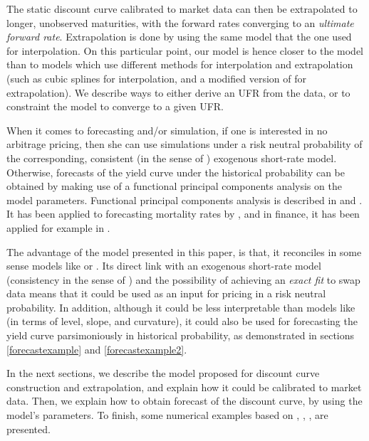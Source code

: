 The static discount curve calibrated to market data can then be extrapolated to longer, unobserved maturities, with the forward rates converging to an \textit{ultimate forward rate}. Extrapolation is done by using the same model that the one used for interpolation. On this particular point, our model is hence closer to the \cite{smithwilson2001} model than to models which use different methods for interpolation and extrapolation (such as cubic splines for interpolation, and a modified version of \cite{nelson1987parsimonious} for extrapolation). We describe ways to either derive an UFR from the data, or to constraint the model to converge to a given UFR.


\medskip

When it comes to forecasting and/or simulation, if one is interested in no arbitrage pricing, then she can use simulations under a risk neutral probability of the corresponding, consistent (in the sense of \cite{bjork1999interest}) exogenous short-rate model. Otherwise, forecasts of the yield curve under the historical probability can be obtained by making use of a functional principal components analysis on the model parameters. Functional principal components analysis is described in \cite{ramsay1991some} and \cite{ramsay2005springer}. It has been applied to forecasting mortality rates by \cite{hyndman2007robust}, and in finance, it has been applied for example in . 

\medskip

The advantage of the model presented in this paper, is that, it reconciles in some sense models like \cite{diebold2006forecasting} or \cite{smithwilson2001}. Its direct link with an exogenous short-rate model (consistency in the sense of \cite{bjork1999interest}) and the possibility of achieving an \textit{exact fit} to swap data means that it could be used as an input for pricing in a risk neutral probability. In addition, although it could be less interpretable than models like \cite{diebold2006forecasting} (in terms of level, slope, and curvature), it could also be used for forecasting the yield curve parsimoniously in historical probability, as demonstrated in sections \ref{forecastexample} and \ref{forecastexample2}.  

\medskip

In the next sections, we describe the model proposed for discount curve construction and extrapolation, and explain how it could be calibrated to market data. Then, we explain how to obtain forecast of the discount curve, by using the model's parameters. To finish, some numerical examples based on \cite{hagan2006interpolation}, \cite{andersen2007discount}, \cite{andersen2010interest}, \cite{ametrano2013everything} are presented.

